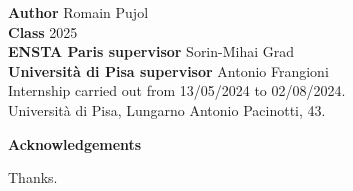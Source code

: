 \documentclass{amsart}
\begin{document}
\noindent\large \textbf{Author} Romain Pujol  \\
\textbf{Class} 2025 \\

\noindent\textbf{ENSTA Paris supervisor} Sorin-Mihai Grad \\ 
\textbf{Università di Pisa supervisor} Antonio Frangioni \\

\noindent Internship carried out from 13/05/2024 to 02/08/2024. 
\\
Università di Pisa, Lungarno Antonio Pacinotti, 43.


\newpage
\thispagestyle{empty}
\mbox{}
\newpage






\begin{titlepage}

    \vspace*{5cm}
        \Large\textbf{Acknowledgements}
    \vspace{1cm}
    
    \normalsize Thanks.
\end{titlepage}

\newpage
\end{document}
